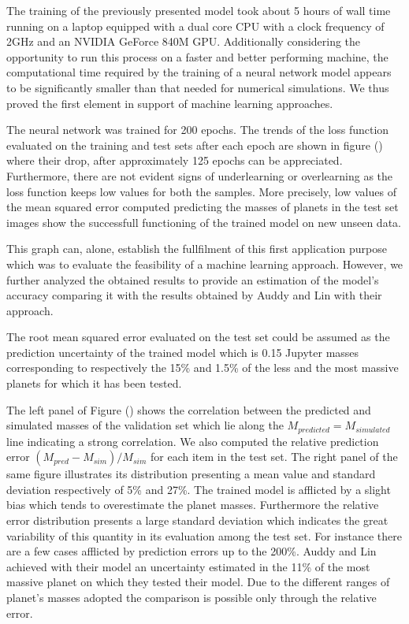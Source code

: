 \documentclass[a4paper,10pt]{report}
\begin{document}
The training of the previously presented model took about 5 hours of wall time running on a laptop equipped with a dual core CPU
with a clock frequency of 2GHz and an NVIDIA GeForce 840M GPU. Additionally considering the opportunity to run
this process on a faster and better performing machine, the computational time required by the training of a neural network
model appears to be significantly smaller than that needed for numerical simulations. We thus proved the
first element in support of machine learning approaches.

The neural network was trained for 200 epochs. The trends of the loss function evaluated on the training and test sets after each epoch are shown
in figure () where their drop, after approximately 125 epochs can be appreciated.
Furthermore, there are not evident signs of underlearning or overlearning as the loss function keeps low values for both the samples.
More precisely, low values of the mean squared error computed predicting the masses of planets in the test set images 
show the successfull functioning of the trained model on new unseen data.

This graph can, alone, establish the fullfilment of this first application purpose which was to evaluate the feasibility of
a machine learning approach. However, we further analyzed the obtained results to provide 
an estimation of the model's accuracy comparing it with the results obtained by Auddy and Lin with their
approach. 

The root mean squared error evaluated on the test set could be assumed as the
prediction uncertainty of the trained model which is 0.15 Jupyter masses corresponding to respectively
the 15\% and 1.5\% of the less and the most massive planets
for which it has been tested.

The left panel of Figure () shows the correlation between the predicted and simulated masses of the validation set which
lie along the $M_{predicted} = M_{simulated}$ line indicating a strong correlation.
We also computed the relative prediction error $(M_{pred} - M_{sim})/M_{sim}$ for each item
in the test set. The right panel of the same figure illustrates its distribution
presenting a mean value and standard deviation respectively of 5\% and 27\%.
The trained model is afflicted by a slight bias which tends to overestimate the planet masses.
Furthermore the relative error distribution presents a large standard deviation which indicates the great
variability of this quantity in its evaluation among the test set. For instance there are a few cases afflicted by
prediction errors up to the 200\%.
Auddy and Lin achieved with their model an uncertainty estimated in the 11\% of the most massive planet on which they tested their model. 
Due to the different ranges of planet's masses adopted the comparison is possible only through the relative error.
\end{document}
